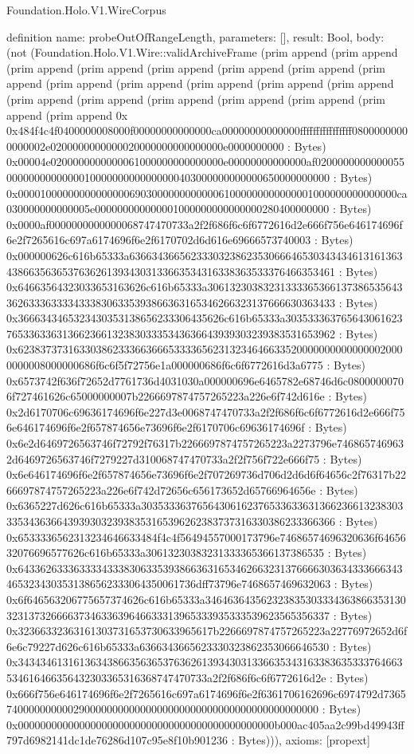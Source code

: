 \begin{lexlean}{Foundation.Holo.V1.WireCorpus}
\begin{semanticmodule}
definition{
  name: probeOutOfRangeLength,
  parameters: [],
  result: Bool,
  body: (not (Foundation.Holo.V1.Wire::validArchiveFrame (prim append (prim append (prim append (prim append (prim append (prim append (prim append (prim append (prim append (prim append (prim append (prim append (prim append (prim append (prim append (prim append (prim append (prim append (prim append (prim append 0x 0x484f4c4f0400000008000f00000000000000ca00000000000000ffffffffffffffff08000000000000002e0200000000000020000000000000000e0000000000 : Bytes) 0x00004e0200000000000061000000000000000e00000000000000af02000000000000550000000000000010000000000000000403000000000000650000000000 : Bytes) 0x00001000000000000000690300000000000061000000000000001000000000000000ca030000000000005e000000000000001000000000000000280400000000 : Bytes) 0x0000af0000000000000068747470733a2f2f686f6c6f6772616d2e666f756e646174696f6e2f7265616c697a6174696f6e2f6170702d6d616e69666573740003 : Bytes) 0x000000626c616b65333a636634366562333032386235306664653034343461316136343866356365376362613934303133663534316338363533376466353461 : Bytes) 0x64663564323033653163626c616b65333a3061323038323133336536613738653564336263336333343338306335393866363165346266323137666630363433 : Bytes) 0x3666343465323430353138656233306435626c616b65333a30353336376564306162376533633631366236613238303335343636643939303239383531653962 : Bytes) 0x6238373731633038623336636665333365623132346466335200000000000000020000000008000000686f6c6f5f72756e1a000000686f6c6f6772616d3a6775 : Bytes) 0x6573742f636f72652d7761736d4031030a000000696e6465782e68746d6c08000000706f727461626c65000000007b2266697874757265223a226e6f742d616e : Bytes) 0x2d6170706c69636174696f6e227d3e0068747470733a2f2f686f6c6f6772616d2e666f756e646174696f6e2f657874656e73696f6e2f6170706c69636174696f : Bytes) 0x6e2d6469726563746f72792f76317b2266697874757265223a2273796e7468657469632d6469726563746f7279227d310068747470733a2f2f756f722e666f75 : Bytes) 0x6e646174696f6e2f657874656e73696f6e2f707269736d706d2d6d6f64656c2f76317b2266697874757265223a226e6f742d72656c656173652d65766964656e : Bytes) 0x6365227d626c616b65333a3035333637656430616237653363363136623661323830333534363664393930323938353165396262383737316330386233366366 : Bytes) 0x6533336562313234646633484f4c4f56494557000173796e74686574696320636f6465632076696577626c616b65333a30613230383231333365366137386535 : Bytes) 0x6433626333633334333830633539386636316534626632313766663036343336663434653234303531386562333064350061736dff73796e7468657469632063 : Bytes) 0x6f646563206775657374626c616b65333a3464636435623238353033343638663531303231373266663734633639646633313965333935333539623565356337 : Bytes) 0x32366332363161303731653730633965617b2266697874757265223a22776972652d6f6e6c79227d626c616b65333a6366343665623330323862353066646530 : Bytes) 0x343434613161363438663563653763626139343031336635343163383635333764663534616466356432303365316368747470733a2f2f686f6c6f6772616d2e : Bytes) 0x666f756e646174696f6e2f7265616c697a6174696f6e2f6361706162696c6974792d736574000000000029000000000000000000000000000000000000000000 : Bytes) 0x0000000000000000000000000000000000000000000000b000ac405aa2c99bd49943ff797d6982141dc1de76286d107c95e8f10b901236 : Bytes))),
  axioms: [propext]
}


\end{semanticmodule}
\end{lexlean}

